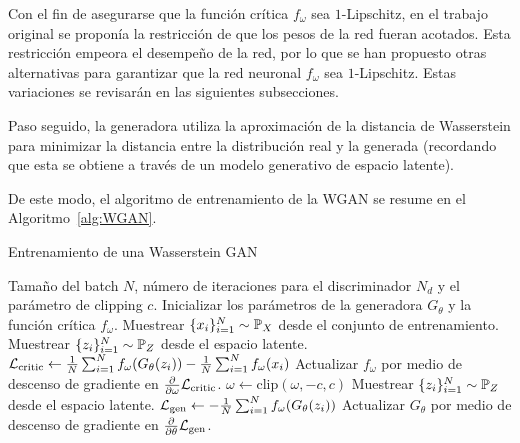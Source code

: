 Con el fin de asegurarse que la función crítica $f_\omega$ sea $1$-Lipschitz, en el trabajo original se proponía la restricción de que los pesos de la red fueran acotados. Esta restricción empeora el desempeño de la red, por lo que se han propuesto otras alternativas para garantizar que la red neuronal $f_\omega$ sea $1$-Lipschitz. Estas variaciones se revisarán en las siguientes subsecciones.

Paso seguido, la generadora utiliza la aproximación de la distancia de Wasserstein para minimizar la distancia entre la distribución real y la generada (recordando que esta se obtiene a través de un modelo generativo de espacio latente).

De este modo, el algoritmo de entrenamiento de la WGAN se resume en el Algoritmo~\ref{alg:WGAN}.

\begin{algorithm}[H]
	\caption{Entrenamiento de una Wasserstein GAN}\label{alg:WGAN}
	\begin{algorithmic}[1]
		\Require Tamaño del batch $N$, número de iteraciones para el discriminador $N_d$ y el parámetro de clipping $c$.
		\State Inicializar los parámetros de la generadora $G_\theta$ y la función crítica $f_\omega$.
		\State Muestrear $\{x_i\}_{i=1}^{N} \sim \Prob_X$ desde el conjunto de entrenamiento.
		\State Muestrear $\{z_i\}_{i=1}^{N} \sim \Prob_Z$ desde el espacio latente.
		\State $\mathcal{L}_{\mathrm{critic}} \gets
			\frac{1}{N} \sum_{i=1}^{N} f_{\omega}(G_\theta(z_i)) - \frac{1}{N} \sum_{i=1}^{N} f_{\omega}(x_i)$ 
		\State Actualizar $f_{\omega}$ por medio de descenso de gradiente en $\pdv{\omega} \mathcal{L}_{\mathrm{critic}}$.
		\State $\omega \gets \text{clip}(\omega, -c, c)$
		\EndFor
		\State Muestrear $\{z_i\}_{i=1}^{N} \sim \Prob_Z$ desde el espacio latente.
		\State $\mathcal{L}_{\mathrm{gen}} \gets - \frac{1}{N}\sum_{i=1}^{N} f_\omega(G_\theta(z_i))$ 
		\State Actualizar $G_\theta$ por medio de descenso de gradiente en $\pdv{\theta} \mathcal{L}_{\mathrm{gen}}$.
		\EndWhile
	\end{algorithmic}
\end{algorithm}


